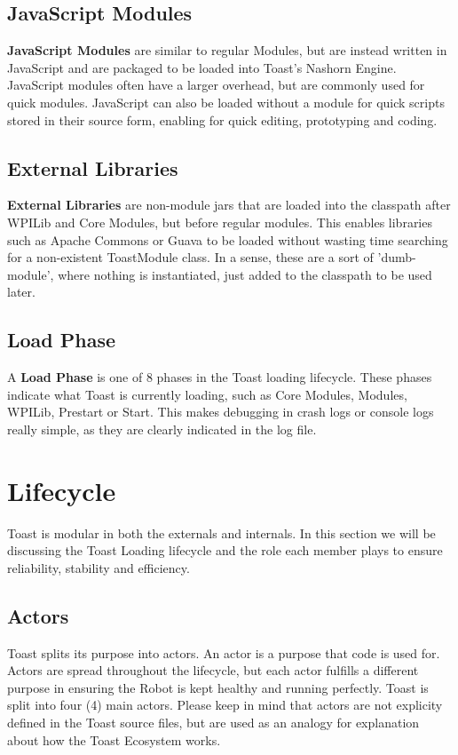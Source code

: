 \documentclass[a4paper,12pt]{article}
\begin{document}
\subsection{JavaScript Modules}
\textbf{JavaScript Modules} are similar to regular Modules, but are instead written in JavaScript and are packaged to be loaded into Toast's Nashorn Engine. JavaScript modules often have a larger overhead, but are commonly used for quick modules. JavaScript can also be loaded without a module for quick scripts stored in their source form, enabling for quick editing, prototyping and coding.

\subsection{External Libraries}
\textbf{External Libraries} are non-module jars that are loaded into the classpath after WPILib and Core Modules, but before regular modules. This enables libraries such as Apache Commons or Guava to be loaded without wasting time searching for a non-existent ToastModule class. In a sense, these are a sort of 'dumb-module', where nothing is instantiated, just added to the classpath to be used later.

\subsection{Load Phase}
A \textbf{Load Phase} is one of 8 phases in the Toast loading lifecycle. These phases indicate what Toast is currently loading, such as Core Modules, Modules, WPILib, Prestart or Start. This makes debugging in crash logs or console logs really simple, as they are clearly indicated in the log file.

\newpage

\section{Lifecycle}
Toast is modular in both the externals and internals. In this section we will be discussing the Toast Loading lifecycle and the role each member plays to ensure reliability, stability and efficiency.

\subsection{Actors}
Toast splits its purpose into actors. An actor is a purpose that code is used for. Actors are spread throughout the lifecycle, but each actor fulfills a different purpose in ensuring the Robot is kept healthy and running perfectly. Toast is split into four (4) main actors. Please keep in mind that actors are not explicity defined in the Toast source files, but are used as an analogy for explanation about how the Toast Ecosystem works.
\end{document}
